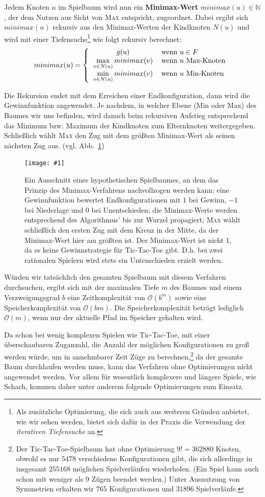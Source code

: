 \documentclass[a4paper]{scrartcl}
\newcommand\q[1]{\glqq #1\grqq}
\newcommand\g[4]{%
  \begin{figure}[!ht]
  \centering
  \texttt{[image: \#1]}
  \caption{#3\label{fig:#2}}
  \end{figure}}
\begin{document}
Jedem Knoten $u$ im Spielbaum wird nun ein \textbf{Minimax-Wert} $minimax(u) \in \mathbb{N}$, der dem Nutzen aus Sicht von \textsc{Max} entspricht, zugeordnet. Dabei ergibt sich $minimax(u)$ rekursiv aus den Minimax-Werten der Kindknoten $N(u)$ und wird mit einer Tiefensuche\footnote{Als zusätzliche Optimierung, die sich auch aus weiteren Gründen anbietet, wie wir sehen werden, bietet sich dafür in der Praxis die Verwendung der \textit{iterativen Tiefensuche} an.} wie folgt rekursiv berechnet:
\[
  minimax(u) = \left\{
  \begin{tabular}{cl}
    $g(u)$ & wenn $u \in F$\\
    $\max\limits_{v \in N(u)} minimax(v)$ & wenn $u$ Max-Knoten\\
    $\min\limits_{v \in N(u)} minimax(v)$ & wenn $u$ Min-Knoten
  \end{tabular}\right.
\]

Die Rekursion endet mit dem Erreichen einer Endkonfiguration, dann wird die Gewinnfunktion angewendet. Je nachdem, in welcher Ebene (Min oder Max) des Baumes wir uns befinden, wird danach beim rekursiven Aufstieg entsprechend das Minimum bzw. Maximum der Kindknoten zum Elternknoten weitergegeben. Schließlich wählt \textsc{Max} den Zug mit dem größten Minimax-Wert als seinen nächsten Zug aus. (vgl. Abb.~\ref{fig:minimax})

\g{img/tic_minmax_2.pdf}{minimax}{Ein Ausschnitt eines hypothetischen Spielbaumes, an dem das Prinzip des Minimax-Verfahrens nachvollzogen werden kann: eine Gewinnfunktion bewertet Endkonfigurationen mit $1$ bei Gewinn, $-1$ bei Niederlage und $0$ bei Unentschieden; die Minimax-Werte werden entsprechend des Algorithmus' bis zur Wurzel propagiert; \textsc{Max} wählt schließlich den ersten Zug mit dem Kreuz in der Mitte, da der Minimax-Wert hier am größten ist. Der Minimax-Wert ist nicht 1, da es keine Gewinnstrategie für Tic-Tac-Toe gibt. D.h. bei zwei rationalen Spielern wird stets ein Untenschieden erzielt werden.}{.4}

Würden wir tatsächlich den gesamten Spielbaum mit diesem Verfahren durchsuchen, ergibt sich mit der maximalen Tiefe $m$ des Baumes und einem Verzweigungsgrad $b$ eine Zeitkomplexität von $\mathcal{O}(b^m)$ sowie eine Speicherkomplexität von $\mathcal{O}(bm)$. Die Speicherkomplexität beträgt lediglich $\mathcal{O}(m)$, wenn nur der aktuelle Pfad im Speicher gehalten wird. 

Da schon bei wenig komplexen Spielen wie Tic-Tac-Toe, mit einer überschaubaren Zuganzahl, die Anzahl der möglichen Konfigurationen zu groß werden würde, um in annehmbarer Zeit Züge zu berechnen,\footnote{Der Tic-Tac-Toe-Spielbaum hat ohne Optimierung $9! = 362880$ Knoten, obwohl es \q{nur} $5478$ verschiedene Konfigurationen gibt, die sich allerdings in insgesamt $255168$ möglichen Spielverläufen wiederholen. (Ein Spiel kann auch schon mit weniger als 9 Zügen beendet werden.) Unter Ausnutzung von Symmetrien erhalten wir $765$ Konfigurationen und $31896$ Spielverläufe.} da der gesamte Baum durchlaufen werden muss, kann das Verfahren ohne Optimierungen nicht angewendet werden. Vor allem für wesentlich komplexere und längere Spiele, wie Schach, kommen daher unter anderem folgende Optimierungen zum Einsatz.
\end{document}
